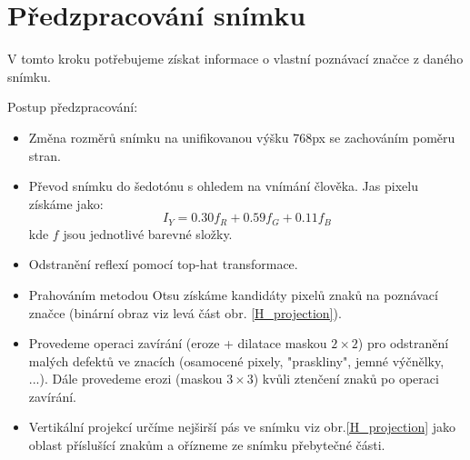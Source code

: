 \documentclass[12pt]{article}
\begin{document}
\section{Předzpracování snímku}
V tomto kroku potřebujeme získat informace o vlastní poznávací značce z daného snímku.

Postup předzpracování:
\begin{itemize}
\renewcommand\labelitemi{--}
\setlength\itemsep{1px}
\item Změna rozměrů snímku na unifikovanou výšku 768px se zachováním poměru stran.
\item Převod snímku do šedotónu s ohledem na vnímání člověka. Jas pixelu získáme jako:
\begin{equation}
{ I }_{ Y }=0.30{ f }_{ R }+{ 0.59 }f_{ G }+{ 0.11 }f_{ B }\nonumber
\end{equation}
kde $f$ jsou jednotlivé barevné složky.

\item Odstranění reflexí pomocí top-hat\cite{Digital_image_processing} transformace.
\item Prahováním metodou Otsu\cite{Otsu_tresholding} získáme kandidáty pixelů znaků na poznávací značce (binární obraz viz levá část obr. \ref{H_projection}).
\item Provedeme operaci zavírání (eroze + dilatace maskou $2 \times 2$) pro odstranění malých defektů ve znacích (osamocené pixely, "praskliny", jemné výčnělky, ...). Dále provedeme erozi (maskou $3 \times 3$) kvůli ztenčení znaků po operaci zavírání.
\item Vertikální projekcí určíme nejširší pás ve snímku viz obr.\ref{H_projection} jako oblast příslušící znakům a ořízneme ze snímku přebytečné části.


\end{itemize}
\end{document}
